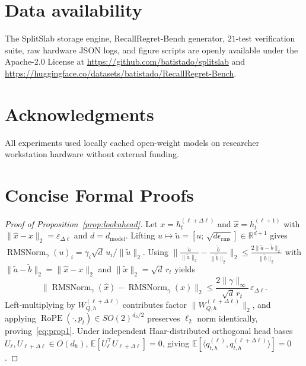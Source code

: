 \documentclass[final,5p,times,twocolumn]{elsarticle}
\theoremstyle{definition}
\theoremstyle{remark}
\newcommand{\SplitSlab}{\textup{\textsc{SplitSlab}}}
\newcommand{\RecallBench}{\textup{\textsc{RecallRegret-Bench}}}
\newcommand{\RMSNorm}{\operatorname{RMSNorm}}
\newcommand{\RoPE}{\operatorname{RoPE}}
\newcommand{\R}{\mathbb{R}}
\newcommand{\E}{\mathbb{E}}
\def\SplitSlab{SplitSlab}%
\def\RecallBench{RecallRegret-Bench}%
\begin{document}
\section*{Data availability}
The \SplitSlab{} storage engine, \RecallBench{} generator, $21$-test verification suite, raw hardware JSON logs, and figure scripts are openly available under the Apache-2.0 License at \url{https://github.com/batistado/splitslab} and \url{https://huggingface.co/datasets/batistado/RecallRegret-Bench}.

\section*{Acknowledgments}
All experiments used locally cached open-weight models on researcher workstation hardware without external funding.

\appendix
\section{Concise Formal Proofs}\label{app:proofs}

\begin{proof}[Proof of Proposition~\ref{prop:lookahead}]
Let $x = h_t^{(\ell+\Delta\ell)}$ and $\hat{x} = h_t^{(\ell+1)}$ with $\|\hat{x} - x\|_2 = \varepsilon_{\Delta\ell}$ and $d = d_{\mathrm{model}}$. Lifting $u \mapsto \tilde{u} = [u;\, \sqrt{d\epsilon_{\mathrm{rms}}}] \in \R^{d+1}$ gives $\RMSNorm_\gamma(u)_i = \gamma_i \sqrt{d}\, u_i / \|\tilde{u}\|_2$. Using $\|\frac{\tilde{a}}{\|\tilde{a}\|_2} - \frac{\tilde{b}}{\|\tilde{b}\|_2}\|_2 \le \frac{2\|\tilde{a} - \tilde{b}\|_2}{\|\tilde{b}\|_2}$ with $\|\tilde{a} - \tilde{b}\|_2 = \|\hat{x} - x\|_2$ and $\|\tilde{x}\|_2 = \sqrt{d}\, r_t$ yields
\begin{equation*}
\|\RMSNorm_\gamma(\hat{x}) - \RMSNorm_\gamma(x)\|_2 \le \frac{2\|\gamma\|_\infty}{\sqrt{d}\, r_t}\,\varepsilon_{\Delta\ell}.
\end{equation*}
Left-multiplying by $W_{Q,h}^{(\ell+\Delta\ell)}$ contributes factor $\|W_{Q,h}^{(\ell+\Delta\ell)}\|_2$, and applying $\RoPE(\cdot, p_t) \in SO(2)^{d_h/2}$ preserves $\ell_2$ norm identically, proving~\eqref{eq:prop1}. Under independent Haar-distributed orthogonal head bases $U_\ell, U_{\ell+\Delta\ell} \in O(d_h)$, $\E[U_\ell^\top U_{\ell+\Delta\ell}] = 0$, giving $\E[\langle q_{t,h}^{(\ell)}, q_{t,h}^{(\ell+\Delta\ell)}\rangle] = 0$.
\end{proof}
\end{document}
